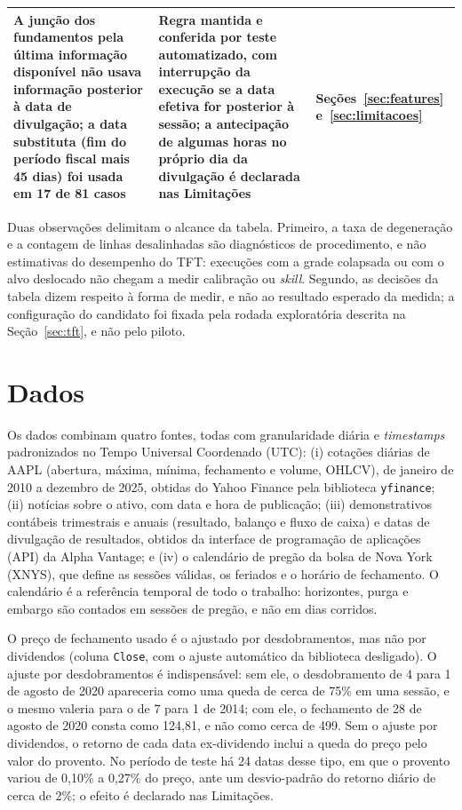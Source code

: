 \begin{table}[htb]
\begin{tabular}{>{\raggedright\arraybackslash}p{5.4cm} >{\raggedright\arraybackslash}p{6.4cm} >{\raggedright\arraybackslash}p{2.6cm}}
\addlinespace
A junção dos fundamentos pela última informação disponível não usava informação posterior à data de divulgação; a data substituta (fim do período fiscal mais 45 dias) foi usada em 17 de 81 casos & Regra mantida e conferida por teste automatizado, com interrupção da execução se a data efetiva for posterior à sessão; a antecipação de algumas horas no próprio dia da divulgação é declarada nas Limitações & Seções~\ref{sec:features} e~\ref{sec:limitacoes} \\
\bottomrule
\end{tabular}
\end{table}

Duas observações delimitam o alcance da tabela. Primeiro, a taxa de degeneração e a contagem de linhas desalinhadas são diagnósticos de procedimento, e não estimativas do desempenho do TFT: execuções com a grade colapsada ou com o alvo deslocado não chegam a medir calibração ou \textit{skill}. Segundo, as decisões da tabela dizem respeito à forma de medir, e não ao resultado esperado da medida; a configuração do candidato foi fixada pela rodada exploratória descrita na Seção~\ref{sec:tft}, e não pelo piloto.

\section{Dados} \label{sec:dados}
Os dados combinam quatro fontes, todas com granularidade diária e \textit{timestamps} padronizados no Tempo Universal Coordenado (UTC): (i) cotações diárias de AAPL (abertura, máxima, mínima, fechamento e volume, OHLCV), de janeiro de 2010 a dezembro de 2025, obtidas do Yahoo Finance pela biblioteca \texttt{yfinance}; (ii) notícias sobre o ativo, com data e hora de publicação; (iii) demonstrativos contábeis trimestrais e anuais (resultado, balanço e fluxo de caixa) e datas de divulgação de resultados, obtidos da interface de programação de aplicações (API) da Alpha Vantage; e (iv) o calendário de pregão da bolsa de Nova York (XNYS), que define as sessões válidas, os feriados e o horário de fechamento. O calendário é a referência temporal de todo o trabalho: horizontes, purga e embargo são contados em sessões de pregão, e não em dias corridos.

O preço de fechamento usado é o ajustado por desdobramentos, mas não por dividendos (coluna \texttt{Close}, com o ajuste automático da biblioteca desligado). O ajuste por desdobramentos é indispensável: sem ele, o desdobramento de 4 para 1 de agosto de 2020 apareceria como uma queda de cerca de 75\% em uma sessão, e o mesmo valeria para o de 7 para 1 de 2014; com ele, o fechamento de 28 de agosto de 2020 consta como 124,81, e não como cerca de 499. Sem o ajuste por dividendos, o retorno de cada data ex-dividendo inclui a queda do preço pelo valor do provento. No período de teste há 24 datas desse tipo, em que o provento variou de 0,10\% a 0,27\% do preço, ante um desvio-padrão do retorno diário de cerca de 2\%; o efeito é declarado nas Limitações.

